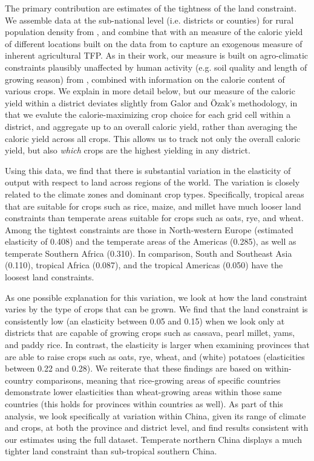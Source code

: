 \documentclass[11pt]{article}
\begin{document}
The primary contribution are estimates of the tightness of the land constraint. We assemble data at the sub-national level (i.e. districts or counties) for rural population density from \citet{hyde31}, and combine that with an measure of the caloric yield of different locations built on the data from \citet{galorozak2016} to capture an exogenous measure of inherent agricultural TFP. As in their work, our measure is built on agro-climatic constraints plausibly unaffected by human activity (e.g. soil quality and length of growing season) from \citet{gaez}, combined with information on the calorie content of various crops. We explain in more detail below, but our measure of the caloric yield within a district deviates slightly from Galor and {\"O}zak's methodology, in that we evalute the calorie-maximizing crop choice for each grid cell within a district, and aggregate up to an overall caloric yield, rather than averaging the caloric yield across all crops. This allows us to track not only the overall caloric yield, but also \textit{which} crops are the highest yielding in any district.

Using this data, we find that there is substantial variation in the elasticity of output with respect to land across regions of the world. The variation is closely related to the climate zones and dominant crop types. Specifically, tropical areas that are suitable for crops such as rice, maize, and millet have much looser land constraints than temperate areas suitable for crops such as oats, rye, and wheat. Among the tightest constraints are those in North-western Europe (estimated elasticity of 0.408) and the temperate areas of the Americas (0.285), as well as temperate Southern Africa (0.310). In comparison, South and Southeast Asia (0.110), tropical Africa (0.087), and the tropical Americas (0.050) have the loosest land constraints. 

As one possible explanation for this variation, we look at how the land constraint varies by the type of crops that can be grown. We find that the land constraint is consistently low (an elasticity between 0.05 and 0.15) when we look only at districts that are capable of growing crops such as cassava, pearl millet, yams, and paddy rice. In contrast, the elasticity is larger when examining provinces that are able to raise crops such as oats, rye, wheat, and (white) potatoes (elasticities between 0.22 and 0.28). We reiterate that these findings are based on within-country comparisons, meaning that rice-growing areas of specific countries demonstrate lower elasticities than wheat-growing areas within those same countries (this holds for provinces within countries as well). As part of this analysis, we look specifically at variation within China, given its range of climate and crops, at both the province and district level, and find results consistent with our estimates using the full dataset. Temperate northern China displays a much tighter land constraint than sub-tropical southern China.
\end{document}
